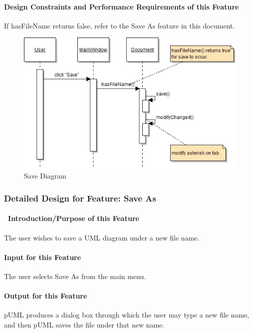 \documentclass[twoside,letterpaper]{article}
\begin{document}
{\paragraph{Design Constraints and Performance Requirements of this Feature}
{
If hasFileName returns false, refer to the Save As feature in this document.
}
\bigskip
\bigskip

\begin{figure}[h]
\centering
\includegraphics[width=6.0in]{IntSave.jpg}
\caption{Save Diagram}
\end{figure}

\clearpage




% 
%

\subsubsection{Detailed Design for Feature: Save As }

\paragraph[\ Introduction/Purpose of this Feature]
{\ Introduction/Purpose of this Feature}
{
The user wishes to save a UML diagram under a new file name.
}

\paragraph[Input for this Feature]{Input for this Feature}
{
The user selects Save As from the main menu.
}

\paragraph{Output for this Feature}
{
pUML produces a dialog box through which the user may type a new file name, and then pUML saves the file under that new name.
}

}
\end{document}
